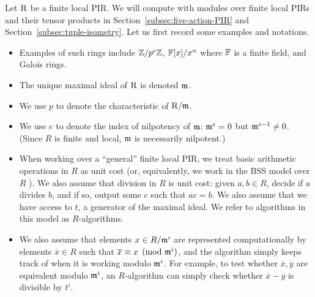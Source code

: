Let $\mathrm{R}$ be a finite local PIR. We will compute with modules over finite local PIRs and their tensor products in Section~\ref{subsec:five-action-PIR} and Section~\ref{subsec:tuple-isometry}. Let us first record some examples and notations.
\begin{itemize}
	\item 
	Examples of such rings include $\mathbb{Z}/p^e \mathbb{Z}$, $\mathbb{F}[x] / x^n$ where $\mathbb{F}$ is a finite field, and Galois rings.%
	
	
	\item The unique maximal ideal of $\mathrm{R}$ is denoted $\mathfrak{m}$.
	
	\item We use $p$ to denote the characteristic of $\mathrm{R}/\mathfrak{m}$.
	
	\item We use $e$ to denote the index of nilpotency of $\mathfrak{m}$: $\mathfrak{m}^e = 0$ but $\mathfrak{m}^{e-1} \neq 0$. (Since $R$ is finite and local, $\mathfrak{m}$ is necessarily nilpotent.)
	
	\item When working over a ``general'' finite local PIR, we treat basic arithmetic operations in $R$ as unit cost (or, equivalently, we work in the BSS model over $R$ \cite{BSS}). We also assume that division in $R$ is unit cost: given $a,b \in R$, decide if $a$ divides $b$, and if so, output some $c$ such that $ac = b$. We also assume that we have access to $t$, a generator of the maximal ideal. We refer to algorithms in this model as $R$-algorithms. 
	
	\item We also assume that elements $x \in R/\mathfrak{m}^i$ are represented computationally by elements $\overline{x} \in R$ such that $\overline{x} \equiv x \pmod{\mathfrak{m}^i}$, and the algorithm simply keeps track of when it is working modulo $\mathfrak{m}^i$. For example, to test whether $\overline{x}, \overline{y}$ are equivalent modulo $\mathfrak{m}^i$, an $R$-algorithm can simply check whether $\overline{x} - \overline{y}$ is divisible by $t^i$. 
		
\end{itemize}

